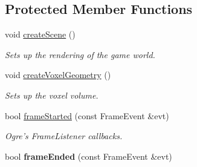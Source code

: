 \subsection*{\-Protected \-Member \-Functions}
\begin{DoxyCompactItemize}
\item 
\hypertarget{classGame_acc39660fc2452fc78ca45330d6032e5c}{
void \hyperlink{classGame_acc39660fc2452fc78ca45330d6032e5c}{create\-Scene} ()}
\label{d9/d68/classGame_acc39660fc2452fc78ca45330d6032e5c}

\begin{DoxyCompactList}\small\item\em \-Sets up the rendering of the game world. \end{DoxyCompactList}\item 
\hypertarget{classGame_a37a0517fd5ff37fcfb81190fafb0c37f}{
void \hyperlink{classGame_a37a0517fd5ff37fcfb81190fafb0c37f}{create\-Voxel\-Geometry} ()}
\label{d9/d68/classGame_a37a0517fd5ff37fcfb81190fafb0c37f}

\begin{DoxyCompactList}\small\item\em \-Sets up the voxel volume. \end{DoxyCompactList}\item 
\hypertarget{classGame_a48b6575e903f4818ba6fb5225d34da83}{
bool \hyperlink{classGame_a48b6575e903f4818ba6fb5225d34da83}{frame\-Started} (const \-Frame\-Event \&evt)}
\label{d9/d68/classGame_a48b6575e903f4818ba6fb5225d34da83}

\begin{DoxyCompactList}\small\item\em \-Ogre's \-Frame\-Listener callbacks. \end{DoxyCompactList}\item 
\hypertarget{classGame_af940f58d53daf598d21227f135ff9727}{
bool {\bfseries frame\-Ended} (const \-Frame\-Event \&evt)}
\label{d9/d68/classGame_af940f58d53daf598d21227f135ff9727}

\end{DoxyCompactItemize}

